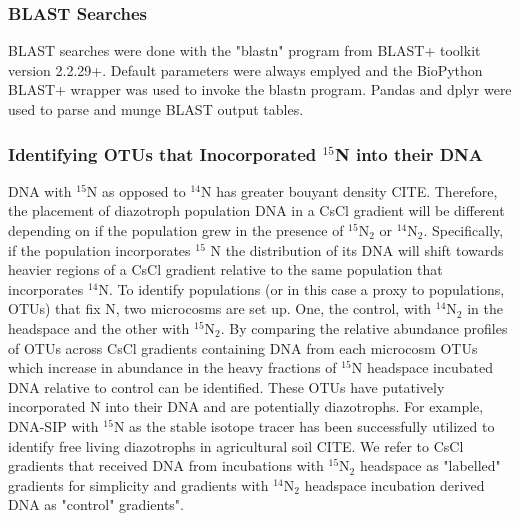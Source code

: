 \subsubsection{BLAST Searches}
BLAST searches were done with the "blastn" program from BLAST+ toolkit \cite{20003500} version 2.2.29+. Default parameters were always emplyed and the BioPython \cite{19304878} BLAST+ wrapper was used to invoke the blastn program. Pandas \cite{citeulike:11241428} and dplyr \cite{dplyr} were used to parse and munge BLAST output tables.  

\subsubsection{Identifying OTUs that Inocorporated $^{15}$N into their DNA}
DNA with $^{15}$N as opposed to $^{14}$N has greater bouyant density CITE. Therefore, the placement of diazotroph population DNA in a CsCl gradient will be different depending on if the population grew in the presence of $^{15}$N$_{2}$ or $^{14}$N$_{2}$. Specifically, if the population incorporates $^{15}$ N the distribution of its DNA will shift towards heavier regions of a CsCl gradient relative to the same population that incorporates $^{14}$N. To identify populations (or in this case a proxy to populations, OTUs) that fix N, two microcosms are set up. One, the control, with $^{14}$N$_{2}$ in the headspace and the other with $^{15}$N$_{2}$. By comparing the relative abundance profiles of OTUs across CsCl gradients containing DNA from each microcosm OTUs which increase in abundance in the heavy fractions of $^{15}$N headspace incubated DNA relative to control can be identified. These OTUs have putatively incorporated N into their DNA and are potentially diazotrophs. For example, DNA-SIP with $^{15}$N as the stable isotope tracer has been successfully utilized to identify free living diazotrophs in agricultural soil CITE. We refer to CsCl gradients that received DNA from incubations with $^{15}$N$_{2}$ headspace as "labelled" gradients for simplicity and gradients with $^{14}$N$_{2}$ headspace incubation derived DNA as "control" gradients".

